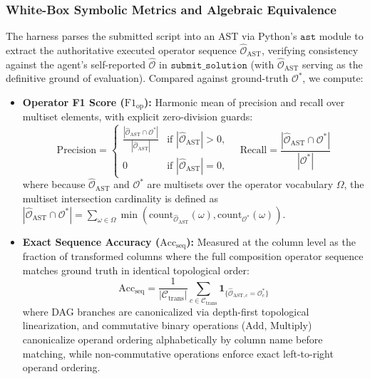 \documentclass[sigconf]{acmart}
\begin{document}
\subsubsection{White-Box Symbolic Metrics and Algebraic Equivalence}
The harness parses the submitted script into an AST via Python's $\texttt{ast}$ module to extract the authoritative executed operator sequence $\widehat{\mathcal{O}}_{\text{AST}}$, verifying consistency against the agent's self-reported $\widehat{\mathcal{O}}$ in $\texttt{submit\_solution}$ (with $\widehat{\mathcal{O}}_{\text{AST}}$ serving as the definitive ground of evaluation). Compared against ground-truth $\mathcal{O}^*$, we compute:
\begin{itemize}
    \item \textbf{Operator F1 Score ($\text{F1}_{\text{op}}$):} Harmonic mean of precision and recall over multiset elements, with explicit zero-division guards:
    \begin{equation}
        \text{Precision} = \begin{cases} \frac{|\widehat{\mathcal{O}}_{\text{AST}} \cap \mathcal{O}^*|}{|\widehat{\mathcal{O}}_{\text{AST}}|} & \text{if } |\widehat{\mathcal{O}}_{\text{AST}}| > 0, \\ 0 & \text{if } |\widehat{\mathcal{O}}_{\text{AST}}| = 0, \end{cases} \quad \text{Recall} = \frac{|\widehat{\mathcal{O}}_{\text{AST}} \cap \mathcal{O}^*|}{|\mathcal{O}^*|}
    \end{equation}
    where because $\widehat{\mathcal{O}}_{\text{AST}}$ and $\mathcal{O}^*$ are multisets over the operator vocabulary $\Omega$, the multiset intersection cardinality is defined as $|\widehat{\mathcal{O}}_{\text{AST}} \cap \mathcal{O}^*| = \sum_{\omega \in \Omega} \min(\text{count}_{\widehat{\mathcal{O}}_{\text{AST}}}(\omega), \text{count}_{\mathcal{O}^*}(\omega))$.
    \item \textbf{Exact Sequence Accuracy ($\text{Acc}_{\text{seq}}$):} Measured at the column level as the fraction of transformed columns where the full composition operator sequence matches ground truth in identical topological order:
    \begin{equation}
        \text{Acc}_{\text{seq}} = \frac{1}{|\mathcal{C}_{\text{trans}}|} \sum_{c \in \mathcal{C}_{\text{trans}}} \mathbf{1}_{\{\widehat{\mathcal{O}}_{\text{AST}, c} = \mathcal{O}^*_c\}}
    \end{equation}
    where DAG branches are canonicalized via depth-first topological linearization, and commutative binary operations ($\text{Add}$, $\text{Multiply}$) canonicalize operand ordering alphabetically by column name before matching, while non-commutative operations enforce exact left-to-right operand ordering.
\end{itemize}
\end{document}
